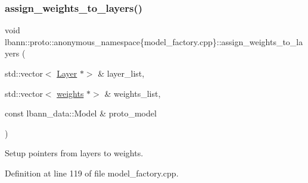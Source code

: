 \subsubsection{\texorpdfstring{assign\+\_\+weights\+\_\+to\+\_\+layers()}{assign\_weights\_to\_layers()}}
{\footnotesize\ttfamily void lbann\+::proto\+::anonymous\+\_\+namespace\{model\+\_\+factory.\+cpp\}\+::assign\+\_\+weights\+\_\+to\+\_\+layers (\begin{DoxyParamCaption}\item[{std\+::vector$<$ \hyperlink{classlbann_1_1Layer}{Layer} $\ast$$>$ \&}]{layer\+\_\+list,  }\item[{std\+::vector$<$ \hyperlink{classlbann_1_1weights}{weights} $\ast$$>$ \&}]{weights\+\_\+list,  }\item[{const lbann\+\_\+data\+::\+Model \&}]{proto\+\_\+model }\end{DoxyParamCaption})}

Setup pointers from layers to weights. 

Definition at line 119 of file model\+\_\+factory.\+cpp.



